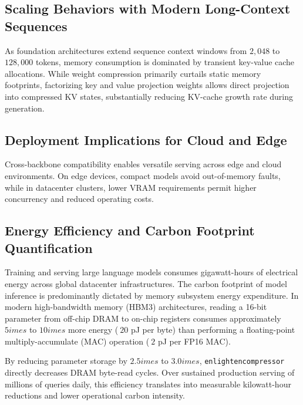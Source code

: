 \subsection{Scaling Behaviors with Modern Long-Context Sequences}
As foundation architectures extend sequence context windows from $2{,}048$ to $128{,}000$ tokens, memory consumption is dominated by transient key-value cache allocations. While weight compression primarily curtails static memory footprints, factorizing key and value projection weights allows direct projection into compressed KV states, substantially reducing KV-cache growth rate during generation.

\subsection{Deployment Implications for Cloud and Edge}
Cross-backbone compatibility enables versatile serving across edge and cloud environments. On edge devices, compact models avoid out-of-memory faults, while in datacenter clusters, lower VRAM requirements permit higher concurrency and reduced operating costs.

\subsection{Energy Efficiency and Carbon Footprint Quantification}
Training and serving large language models consumes gigawatt-hours of electrical energy across global datacenter infrastructures. The carbon footprint of model inference is predominantly dictated by memory subsystem energy expenditure. In modern high-bandwidth memory (HBM3) architectures, reading a 16-bit parameter from off-chip DRAM to on-chip registers consumes approximately $5	imes$ to $10	imes$ more energy ($~20$ pJ per byte) than performing a floating-point multiply-accumulate (MAC) operation ($~2$ pJ per FP16 MAC).

By reducing parameter storage by $2.5	imes$ to $3.0	imes$, \texttt{enlightencompressor} directly decreases DRAM byte-read cycles. Over sustained production serving of millions of queries daily, this efficiency translates into measurable kilowatt-hour reductions and lower operational carbon intensity.
